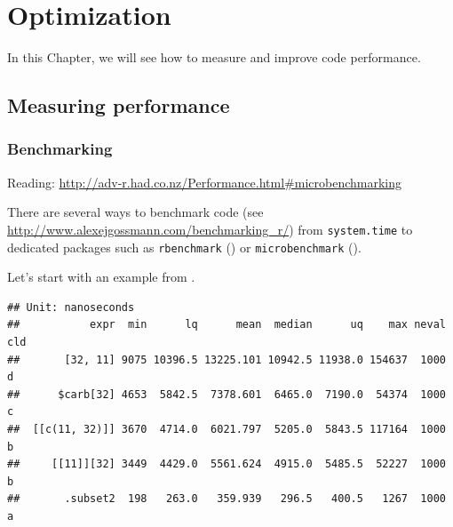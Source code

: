 \documentclass[]{book}
\newenvironment{Shaded}{\begin{snugshade}}{\end{snugshade}}
\newcommand{\KeywordTok}[1]{\textcolor[rgb]{0.13,0.29,0.53}{\textbf{#1}}}
\newcommand{\DataTypeTok}[1]{\textcolor[rgb]{0.13,0.29,0.53}{#1}}
\newcommand{\DecValTok}[1]{\textcolor[rgb]{0.00,0.00,0.81}{#1}}
\newcommand{\StringTok}[1]{\textcolor[rgb]{0.31,0.60,0.02}{#1}}
\newcommand{\CommentTok}[1]{\textcolor[rgb]{0.56,0.35,0.01}{\textit{#1}}}
\newcommand{\OperatorTok}[1]{\textcolor[rgb]{0.81,0.36,0.00}{\textbf{#1}}}
\newcommand{\NormalTok}[1]{#1}
\theoremstyle{definition}
\theoremstyle{definition}
\theoremstyle{definition}
\theoremstyle{remark}
\begin{document}
\chapter{Optimization}\label{optimization}

In this Chapter, we will see how to measure and improve code
performance.

\section{Measuring performance}\label{measuring-performance}

\subsection{Benchmarking}\label{benchmarking}

Reading:
\url{http://adv-r.had.co.nz/Performance.html\#microbenchmarking}

There are several ways to benchmark code (see
\url{http://www.alexejgossmann.com/benchmarking_r/}) from
\texttt{system.time} to dedicated packages such as \texttt{rbenchmark}
(\citet{rbenchmark}) or \texttt{microbenchmark}
(\citet{microbenchmark}).

Let's start with an example from \citet{Wickham2014}.

\begin{Shaded}
\end{Shaded}

\begin{verbatim}
## Unit: nanoseconds
##           expr  min      lq      mean  median      uq    max neval  cld
##       [32, 11] 9075 10396.5 13225.101 10942.5 11938.0 154637  1000    d
##      $carb[32] 4653  5842.5  7378.601  6465.0  7190.0  54374  1000   c 
##  [[c(11, 32)]] 3670  4714.0  6021.797  5205.0  5843.5 117164  1000  b  
##     [[11]][32] 3449  4429.0  5561.624  4915.0  5485.5  52227  1000  b  
##       .subset2  198   263.0   359.939   296.5   400.5   1267  1000 a
\end{verbatim}
\end{document}
